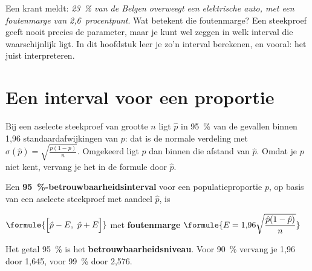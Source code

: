 %



Een krant meldt: \textit{23~\% van de Belgen overweegt een elektrische auto, met een foutenmarge van 2,6~procentpunt}. Wat betekent die foutenmarge? Een steekproef geeft nooit precies de parameter, maar je kunt wel zeggen in welk interval die waarschijnlijk ligt. In dit hoofdstuk leer je zo'n interval berekenen, en vooral: het juist interpreteren.

\begin{oefeningen}[Start]

\end{oefeningen}

\section{Een interval voor een proportie}

Bij een aselecte steekproef van grootte $n$ ligt $\hat{p}$ in 95~\% van de gevallen binnen 1,96 standaardafwijkingen van $p$: dat is de normale verdeling met $\sigma(\hat{p}) = \sqrt{\frac{p(1 - p)}{n}}$. Omgekeerd ligt $p$ dan binnen die afstand van $\hat{p}$. Omdat je $p$ niet kent, vervang je het in de formule door $\hat{p}$.

\begin{theorie}
Een \textbf{\textcolor{accent}{95~\%-betrouwbaarheidsinterval}} voor een populatieproportie $p$, op basis van een aselecte steekproef met aandeel $\hat{p}$, is

\vspace{1mm}
\qquad $\formule{\Bigl[\hat{p} - E,\ \hat{p} + E\Bigr]}$ \quad met \textbf{\textcolor{accent}{foutenmarge}} \quad $\formule{E = 1{,}96 \sqrt{\dfrac{\hat{p}(1 - \hat{p})}{n}}}$

\vspace{1mm}
Het getal 95~\% is het \textbf{\textcolor{accent}{betrouwbaarheidsniveau}}. Voor 90~\% vervang je 1,96 door 1,645, voor 99~\% door 2,576.
\end{theorie}

